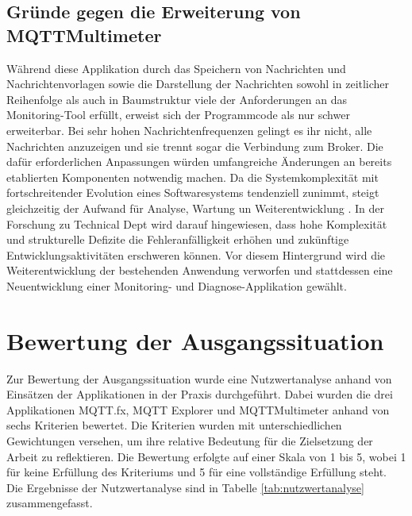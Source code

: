 \subsection{Gründe gegen die Erweiterung von MQTTMultimeter}
    Während diese Applikation durch das Speichern von Nachrichten und Nachrichtenvorlagen sowie die Darstellung der Nachrichten sowohl in zeitlicher Reihenfolge als auch in Baumstruktur viele der Anforderungen an das Monitoring-Tool erfüllt, erweist sich der Programmcode als nur schwer erweiterbar. Bei sehr hohen Nachrichtenfrequenzen gelingt es ihr nicht, alle Nachrichten anzuzeigen und sie trennt sogar die Verbindung zum Broker. Die dafür erforderlichen Anpassungen würden umfangreiche Änderungen an bereits etablierten Komponenten notwendig machen. Da die Systemkomplexität mit fortschreitender Evolution eines Softwaresystems tendenziell zunimmt, steigt gleichzeitig der Aufwand für Analyse, Wartung un Weiterentwicklung \autocite{milanovicLehmansLawsSoftware}. In der Forschung zu Technical Dept \autocite{avgeriouTechnicalDebtManagement2023} wird darauf hingewiesen, dass hohe Komplexität und strukturelle Defizite die Fehleranfälligkeit erhöhen und zukünftige Entwicklungsaktivitäten erschweren können. Vor diesem Hintergrund wird die Weiterentwicklung der bestehenden Anwendung verworfen und stattdessen eine Neuentwicklung einer Monitoring- und Diagnose-Applikation gewählt.

\section{Bewertung der Ausgangssituation}
Zur Bewertung der Ausgangssituation wurde eine Nutzwertanalyse anhand von Einsätzen der Applikationen in der Praxis durchgeführt. Dabei wurden die drei Applikationen MQTT.fx, MQTT Explorer und MQTTMultimeter anhand von sechs Kriterien bewertet. Die Kriterien wurden mit unterschiedlichen Gewichtungen versehen, um ihre relative Bedeutung für die Zielsetzung der Arbeit zu reflektieren. Die Bewertung erfolgte auf einer Skala von 1 bis 5, wobei 1 für keine Erfüllung des Kriteriums und 5 für eine vollständige Erfüllung steht. Die Ergebnisse der Nutzwertanalyse sind in Tabelle \ref{tab:nutzwertanalyse} zusammengefasst.

